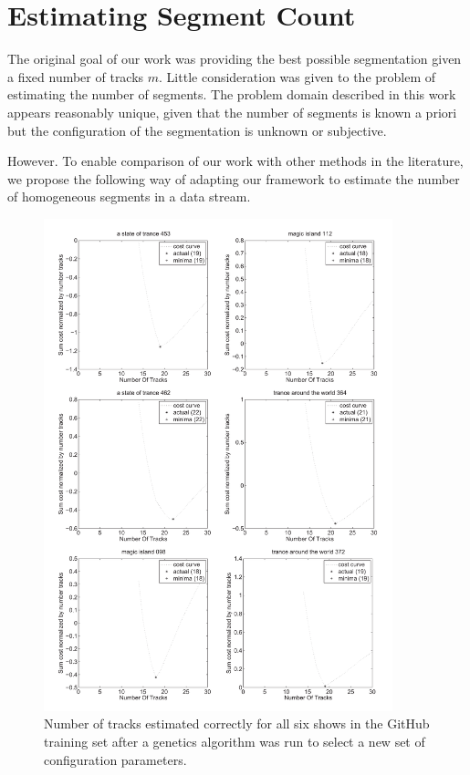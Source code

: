 \documentclass[twocolumn]{article}
\begin{document}
\section{Estimating Segment Count}\label{sec:trackcount}

The original goal of our work was providing the best possible segmentation given a fixed number of tracks $m$. Little consideration was given to the problem of estimating the number of segments. The problem domain described in this work appears reasonably unique, given that the number of segments is known a priori but the configuration of the segmentation is unknown or subjective. 

However. To enable comparison of our work with other methods in the literature, we propose the following way of adapting our framework to estimate the number of homogeneous segments in a data stream. 

	\begin{figure}
		\centering
		\includegraphics[width=0.9\textwidth]{track_estimation}
		\caption{Number of tracks estimated correctly for all six shows in the GitHub training set after a genetics algorithm was run to select a new set of configuration parameters.}
		\label{fig:github_trackestimation}
	\end{figure}
\end{document}
